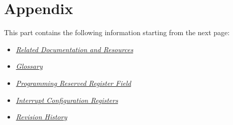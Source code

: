 \documentclass[openany, 10pt]{book}
\begin{document}

\part{Appendix}\label{appendix}

This part contains the following information starting from the next page:

\begin{itemize}
    \item \hyperref[sec:resources]{\textit{Related Documentation and Resources}}
    \item \hyperref[glossary]{\textit{Glossary}}
    \item \hyperref[programming-reserved-field]{\textit{Programming Reserved Register Field}}
    \item \hyperref[interrupt-config-registers]{\textit{Interrupt Configuration Registers}}
    \item \hyperref[revision-history]{\textit{Revision History}}
\end{itemize}



\clearpage


\clearpage


\clearpage


\clearpage


\clearpage


\clearpage

\end{document}
